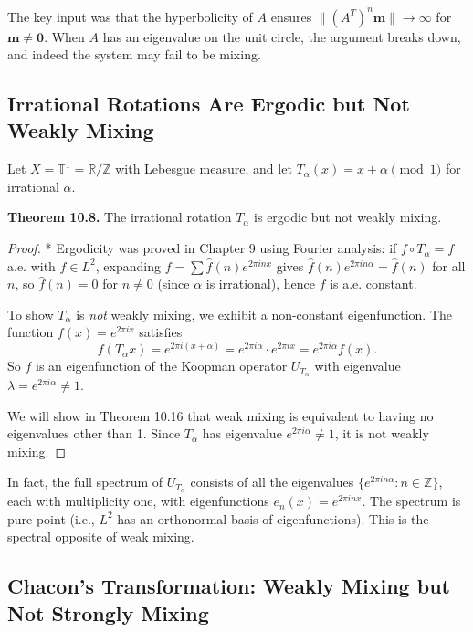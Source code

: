 \begin{remark}
The key input was that the hyperbolicity of $A$ ensures $\|(A^T)^n\mathbf{m}\| \to \infty$ for $\mathbf{m} \ne \mathbf{0}$. When $A$ has an eigenvalue on the unit circle, the argument breaks down, and indeed the system may fail to be mixing.
\end{remark}


\subsection{Irrational Rotations Are Ergodic but Not Weakly Mixing}\label{sec:10.3.3}

Let $X = \mathbb{T}^1 = \mathbb{R}/\mathbb{Z}$ with Lebesgue measure, and let $T_\alpha(x) = x + \alpha \pmod{1}$ for irrational $\alpha$.

\textbf{Theorem 10.8.} The irrational rotation $T_\alpha$ is ergodic but not weakly mixing.

\begin{proof}
* Ergodicity was proved in Chapter 9 using Fourier analysis: if $f \circ T_\alpha = f$ a.e. with $f \in L^2$, expanding $f = \sum \hat{f}(n) e^{2\pi i n x}$ gives $\hat{f}(n) e^{2\pi i n \alpha} = \hat{f}(n)$ for all $n$, so $\hat{f}(n) = 0$ for $n \ne 0$ (since $\alpha$ is irrational), hence $f$ is a.e. constant.

To show $T_\alpha$ is \textit{not} weakly mixing, we exhibit a non-constant eigenfunction. The function $f(x) = e^{2\pi i x}$ satisfies
\[
f(T_\alpha x) = e^{2\pi i (x + \alpha)} = e^{2\pi i \alpha} \cdot e^{2\pi i x} = e^{2\pi i \alpha} f(x).
\]
So $f$ is an eigenfunction of the Koopman operator $U_{T_\alpha}$ with eigenvalue $\lambda = e^{2\pi i \alpha} \ne 1$.

We will show in Theorem 10.16 that weak mixing is equivalent to having no eigenvalues other than 1. Since $T_\alpha$ has eigenvalue $e^{2\pi i \alpha} \ne 1$, it is not weakly mixing.
\end{proof}


\begin{remark}
In fact, the full spectrum of $U_{T_\alpha}$ consists of all the eigenvalues $\{e^{2\pi i n \alpha} : n \in \mathbb{Z}\}$, each with multiplicity one, with eigenfunctions $e_n(x) = e^{2\pi i n x}$. The spectrum is pure point (i.e., $L^2$ has an orthonormal basis of eigenfunctions). This is the spectral opposite of weak mixing.
\end{remark}


\subsection{Chacon's Transformation: Weakly Mixing but Not Strongly Mixing}\label{sec:10.3.4}

